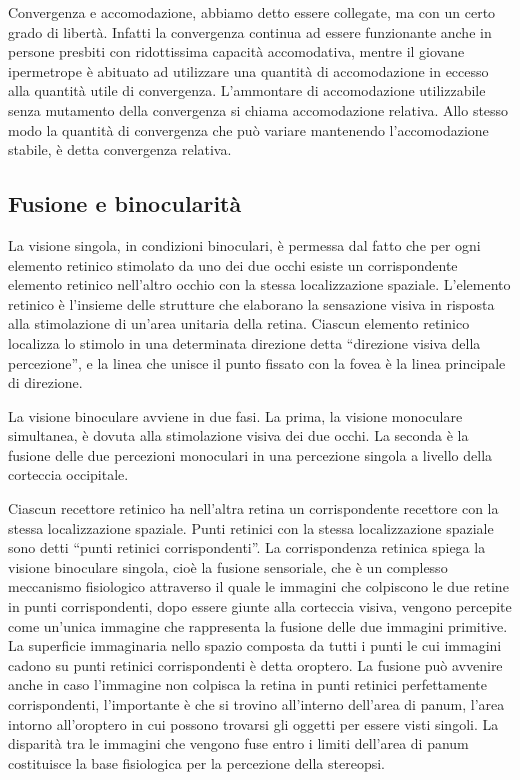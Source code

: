 Convergenza e accomodazione, abbiamo detto essere collegate, ma con un certo grado di libertà. Infatti la convergenza continua ad essere funzionante anche in persone presbiti con ridottissima capacità accomodativa, mentre il giovane ipermetrope è abituato ad utilizzare una quantità di accomodazione in eccesso alla quantità utile di convergenza. L’ammontare di accomodazione utilizzabile senza mutamento della convergenza si chiama accomodazione relativa. Allo stesso modo la quantità di convergenza che può variare mantenendo l’accomodazione stabile, è detta convergenza relativa.



\subsection{Fusione e binocularità}

La visione singola, in condizioni binoculari, è permessa dal fatto che per ogni elemento retinico stimolato da uno dei due occhi esiste un corrispondente elemento retinico nell’altro occhio con la stessa localizzazione spaziale. L’elemento retinico è l’insieme delle strutture che elaborano la sensazione visiva in risposta alla stimolazione di un’area unitaria della retina. Ciascun elemento retinico localizza lo stimolo in una determinata direzione detta “direzione visiva della percezione”, e la linea che unisce il punto fissato con la fovea è la linea principale di direzione.

La visione binoculare avviene in due fasi. La prima, la visione monoculare simultanea, è dovuta alla stimolazione visiva dei due occhi. La seconda è la fusione delle due percezioni monoculari in una percezione singola a livello della corteccia occipitale.

Ciascun recettore retinico ha nell’altra retina un corrispondente recettore con la stessa localizzazione spaziale. Punti retinici con la stessa localizzazione spaziale sono detti “punti retinici corrispondenti”. La corrispondenza retinica spiega la visione binoculare singola, cioè la fusione sensoriale, che è un complesso meccanismo fisiologico attraverso il quale le immagini che colpiscono le due retine in punti corrispondenti, dopo essere giunte alla corteccia visiva, vengono percepite come un’unica immagine che rappresenta la fusione delle due immagini primitive. La superficie immaginaria nello spazio composta da tutti i punti le cui immagini cadono su punti retinici corrispondenti è detta oroptero. La fusione può avvenire anche in caso l’immagine non colpisca la retina in punti retinici perfettamente corrispondenti, l’importante è che si trovino all’interno dell’area di panum, l’area intorno all’oroptero in cui possono trovarsi gli oggetti per essere visti singoli. La disparità tra le immagini che vengono fuse entro i limiti dell’area di panum costituisce la base fisiologica per la percezione della stereopsi.

